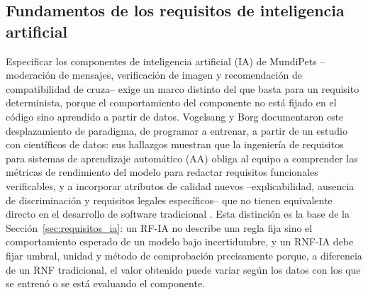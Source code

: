 \documentclass[journal,onecolumn]{IEEEtran}
\begin{document}
	

	
	\subsection*{Fundamentos de los requisitos de inteligencia artificial}

	Especificar los componentes de inteligencia artificial (IA) de MundiPets --moderación
	de mensajes, verificación de imagen y recomendación de compatibilidad de cruza-- exige un
	marco distinto del que basta para un requisito determinista, porque el comportamiento del
	componente no está fijado en el código sino aprendido a partir de datos. Vogelsang y Borg
	documentaron este desplazamiento de paradigma, de programar a entrenar, a partir de un
	estudio con científicos de datos: sus hallazgos muestran que la ingeniería de requisitos para
	sistemas de aprendizaje automático (AA) obliga al equipo a comprender las métricas de
	rendimiento del modelo para redactar requisitos funcionales verificables, y a incorporar
	atributos de calidad nuevos --explicabilidad, ausencia de discriminación y requisitos
	legales específicos-- que no tienen equivalente directo en el desarrollo de software
	tradicional \cite{vogelsang2019}. Esta distinción es la base de la Sección~\ref{sec:requisitos_ia}: un RF-IA no describe una regla fija sino el comportamiento esperado de un modelo bajo
	incertidumbre, y un RNF-IA debe fijar umbral, unidad y método de comprobación precisamente
	porque, a diferencia de un RNF tradicional, el valor obtenido puede variar según los datos con
	los que se entrenó o se está evaluando el componente.
\end{document}
